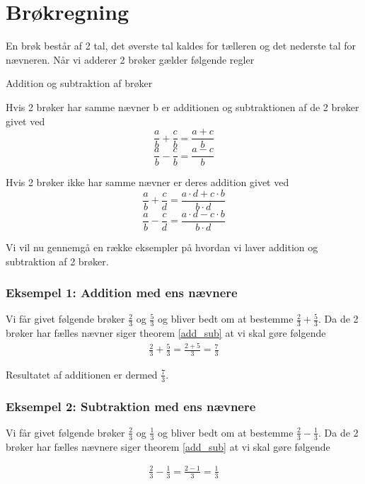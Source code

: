 \section*{Brøkregning}

En brøk består af 2 tal, det øverste tal kaldes for tælleren og det nederste tal for nævneren. Når vi adderer 2 brøker gælder følgende regler

\begin{frm-thm}{Addition og subtraktion af brøker}


Hvis 2 brøker har samme nævner b er additionen og subtraktionen af de 2 brøker givet ved
\[ \frac{a}{b} + \frac{c}{b} = \frac{a + c}{b}   \]
\[\frac{a}{b} - \frac{c}{b} = \frac{a - c}{b}\]

Hvis 2 brøker ikke har samme nævner er deres addition givet ved
\[ \frac{a}{b} + \frac{c}{d} = \frac{a\cdot d + c \cdot b}{b \cdot d} \]
\[\frac{a}{b} - \frac{c}{d} = \frac{a\cdot d - c\cdot b}{b \cdot d} \]
\end{frm-thm}

Vi vil nu gennemgå en række eksempler på hvordan vi laver addition og subtraktion af 2 brøker.

\subsubsection*{Eksempel 1: Addition med ens nævnere}

Vi får givet følgende brøker $\frac{2}{3}$ og $\frac{5}{3}$ og bliver bedt om at bestemme $\frac{2}{3} + \frac{5}{3}$. Da de 2 brøker har fælles nævner siger theorem \ref{add_sub} at vi skal gøre følgende
\begin{align*}
\frac{2}{3} + \frac{5}{3} = \frac{2 + 5}{3} = \frac{7}{3}
\end{align*}

Resultatet af additionen er dermed $\frac{7}{3}$.

\subsubsection*{Eksempel 2: Subtraktion med ens nævnere}

Vi får givet følgende brøker $\frac{2}{3}$ og $\frac{1}{3}$ og bliver bedt om at bestemme $\frac{2}{3} - \frac{1}{3}$. Da de 2 brøker har fælles nævnere siger theorem \ref{add_sub} at vi skal gøre følgende

\begin{align*}
\frac{2}{3} - \frac{1}{3} = \frac{2 - 1}{3} = \frac{1}{3}
\end{align*}

